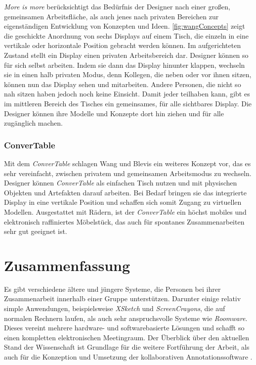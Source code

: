 \emph{More is more} berücksichtigt das Bedürfnis der Designer nach einer großen, gemeinsamen Arbeitsfläche, als auch jenes nach privaten Bereichen zur eigenständigen Entwicklung von Konzepten und Ideen. \autoref{fig:wangConcepts} zeigt die geschickte Anordnung von sechs Displays auf einem Tisch, die einzeln in eine vertikale oder horizontale Position gebracht werden können. Im aufgerichteten Zustand stellt ein Display einen privaten Arbeitsbereich dar. Designer können so für sich selbst arbeiten. Indem sie dann das Display hinunter klappen, wechseln sie in einen halb privaten Modus, denn Kollegen, die neben oder vor ihnen sitzen, können nun das Display sehen und mitarbeiten. Andere Personen, die nicht so nah sitzen haben jedoch noch keine Einsicht. Damit jeder teilhaben kann, gibt es im mittleren Bereich des Tisches ein gemeinsames, für alle sichtbares Display. Die Designer können ihre Modelle und Konzepte dort hin ziehen und für alle zugänglich machen.

\subsubsection{ConverTable} 

Mit dem \emph{ConverTable} schlagen Wang und Blevis ein weiteres Konzept vor, das es sehr vereinfacht, zwischen privatem und gemeinsamen Arbeitsmodus zu wechseln. Designer können \emph{ConverTable} als einfachen Tisch nutzen und mit physischen Objekten und Artefakten darauf arbeiten. Bei Bedarf bringen sie das integrierte Display in eine vertikale Position und schaffen sich somit Zugang zu virtuellen Modellen. Ausgestattet mit Rädern, ist der \emph{ConverTable} ein höchst mobiles und elektronisch raffiniertes Möbelstück, das auch für spontanes Zusammenarbeiten sehr gut geeignet ist.

\section*{Zusammenfassung}
Es gibt verschiedene ältere und jüngere Systeme, die Personen bei ihrer Zusammenarbeit innerhalb einer Gruppe unterstützen. Darunter einige relativ simple Anwendungen, beispielsweise \emph{XSketch} und \emph{ScreenCrayons}, die auf normalen Rechnern laufen, als auch sehr anspruchsvolle Systeme wie \emph{Roomware}. Dieses vereint mehrere hardware- und softwarebasierte Lösungen und schafft so einen kompletten elektronischen Meetingraum. Der Überblick über den aktuellen Stand der Wissenschaft ist Grundlage für die weitere Fortführung der Arbeit, als auch für die Konzeption und Umsetzung der kollaborativen Annotationssoftware \scribbler.

